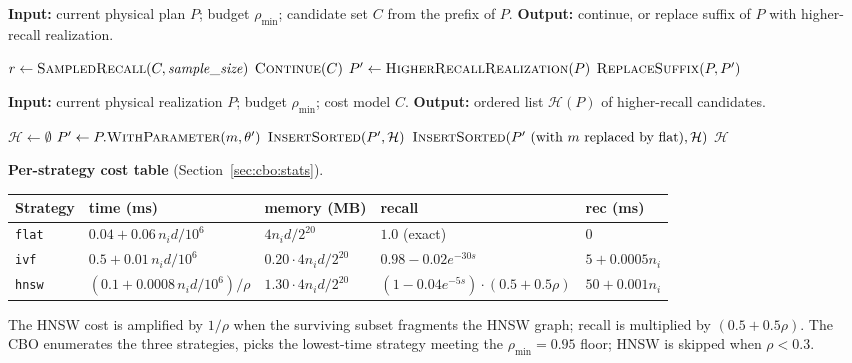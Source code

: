 \documentclass[sigconf]{acmart}
\theoremstyle{plain}
\theoremstyle{definition}
\theoremstyle{remark}
\begin{document}
\begin{algorithm}[t]
\caption{Adaptive re-planning at a plan point (B).}
\textbf{Input:} current physical plan $P$; budget $\rho_{\min}$;
candidate set $C$ from the prefix of $P$.
\textbf{Output:} continue, or replace suffix of $P$ with higher-recall realization.
\begin{algorithmic}[1]
  \State $r \gets \Call{SampledRecall}{C, \mathit{sample\_size}}$
   \State \Return $\Call{Continue}{C}$ \EndIf
  \State $P' \gets \Call{HigherRecallRealization}{P}$
  \State \Return $\Call{ReplaceSuffix}{P, P'}$
\end{algorithmic}
\end{algorithm}

\begin{algorithm}[t]
\caption{Higher-recall realization precomputation (called by Algorithm~3).}
\textbf{Input:} current physical realization $P$; budget $\rho_{\min}$;
cost model $C$.
\textbf{Output:} ordered list $\mathcal{H}(P)$ of higher-recall candidates.
\begin{algorithmic}[1]
  \State $\mathcal{H} \gets \emptyset$
      \State $P' \gets P.\Call{WithParameter}{m, \theta'}$
        \State $\Call{InsertSorted}{P', \mathcal{H}}$
      \EndIf
    \EndFor
  \EndFor
    \State $\Call{InsertSorted}{P' \text{ (with $m$ replaced by flat)}, \mathcal{H}}$
  \EndIf
  \State \Return $\mathcal{H}$
\end{algorithmic}
\end{algorithm}

\noindent\textbf{Per-strategy cost table} (Section~\ref{sec:cbo:stats}).
\begin{center}
\begin{tabular}{lllll}
\toprule
Strategy & time (ms) & memory (MB) & recall & rec (ms) \\
\midrule
\texttt{flat}  & $0.04 + 0.06\, n_i d / 10^6$        & $4 n_i d / 2^{20}$          & $1.0$ (exact)        & $0$            \\
\texttt{ivf}   & $0.5 + 0.01\, n_i d / 10^6$         & $0.20 \cdot 4 n_i d / 2^{20}$ & $0.98 - 0.02 e^{-30 s}$ & $5 + 0.0005 n_i$  \\
\texttt{hnsw}  & $(0.1 + 0.0008\, n_i d / 10^6) / \rho$ & $1.30 \cdot 4 n_i d / 2^{20}$ & $(1 - 0.04 e^{-5 s}) \cdot (0.5 + 0.5 \rho)$  & $50 + 0.001 n_i$  \\
\bottomrule
\end{tabular}
\end{center}
The HNSW cost is amplified by $1/\rho$ when the surviving subset
fragments the HNSW graph; recall is multiplied by $(0.5 + 0.5\rho)$.
The CBO enumerates the three strategies, picks the lowest-time
strategy meeting the $\rho_{\min} = 0.95$ floor; HNSW is skipped when
$\rho < 0.3$.
\end{document}
